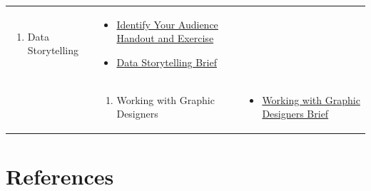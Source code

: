 \documentclass[
]{book}
\providecommand{\tightlist}{%
  \setlength{\itemsep}{0pt}\setlength{\parskip}{0pt}}
\begin{document}
\begin{longtable}[]{@{}lll@{}}
\begin{minipage}[t]{0.34\columnwidth}
\begin{enumerate}
\def\labelenumi{\arabic{enumi}.}
\setcounter{enumi}{1}
\tightlist
\item
  Data Storytelling
\end{enumerate}\strut
\end{minipage} & \begin{minipage}[t]{0.42\columnwidth}\raggedright
\begin{itemize}
\tightlist
\item
  \href{files/M4S2_Data_Storytelling_Audience_Handout_Exercise.pdf}{Identify Your Audience Handout and Exercise}
\item
  \href{files/M4S2_Data_Storytelling_Brief.pdf}{Data Storytelling Brief}
\end{itemize}\strut
\end{minipage}\tabularnewline
\begin{minipage}[t]{0.15\columnwidth}\raggedright
\strut
\end{minipage} & \begin{minipage}[t]{0.34\columnwidth}\raggedright
\begin{enumerate}
\def\labelenumi{\arabic{enumi}.}
\setcounter{enumi}{2}
\tightlist
\item
  Working with Graphic Designers
\end{enumerate}\strut
\end{minipage} & \begin{minipage}[t]{0.42\columnwidth}\raggedright
\begin{itemize}
\tightlist
\item
  \href{files/M4S3_Working_With_Graphic_Designers_Brief.pdf}{Working with Graphic Designers Brief}
\end{itemize}\strut
\end{minipage}\tabularnewline
\bottomrule
\end{longtable}

\hypertarget{references}{%
\section{References}\label{references}}
\end{document}
